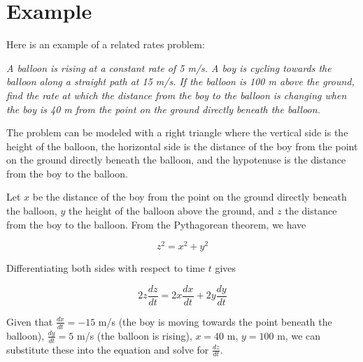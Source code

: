 \section{Example}

Here is an example of a related rates problem:

\textit{A balloon is rising at a constant rate of 5 m/s. A boy is cycling towards the balloon along a straight path at 15 m/s. If the balloon is 100 m above the ground, find the rate at which the distance from the boy to the balloon is changing when the boy is 40 m from the point on the ground directly beneath the balloon.}

The problem can be modeled with a right triangle where the vertical side is the height of the balloon, the horizontal side is the distance of the boy from the point on the ground directly beneath the balloon, and the hypotenuse is the distance from the boy to the balloon.

Let $x$ be the distance of the boy from the point on the ground directly beneath the balloon, $y$ the height of the balloon above the ground, and $z$ the distance from the boy to the balloon. From the Pythagorean theorem, we have 

\begin{equation}
z^2 = x^2 + y^2
\end{equation}

Differentiating both sides with respect to time $t$ gives

\begin{equation}
2z \frac{dz}{dt} = 2x \frac{dx}{dt} + 2y \frac{dy}{dt}
\end{equation}

Given that $\frac{dx}{dt} = -15$ m/s (the boy is moving towards the point beneath the balloon), $\frac{dy}{dt} = 5$ m/s (the balloon is rising), $x=40$ m, $y=100$ m, we can substitute these into the equation and solve for $\frac{dz}{dt}$.
